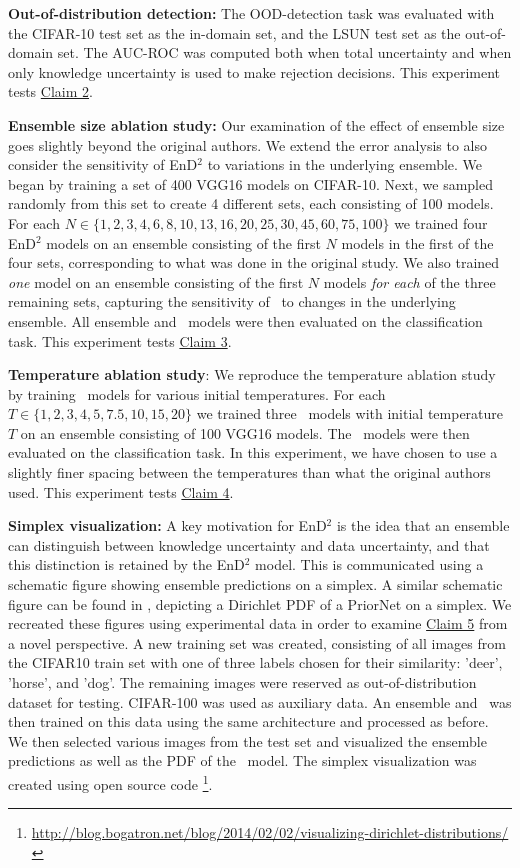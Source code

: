 \textbf{Out-of-distribution detection:} The OOD-detection task was evaluated with the CIFAR-10 test set as the in-domain set, and the LSUN test set as the out-of-domain set. The AUC-ROC was computed both when total uncertainty and when only knowledge uncertainty is used to make rejection decisions. This experiment tests \hyperlink{claim2}{Claim 2}. 

\textbf{Ensemble size ablation study:} Our examination of the effect of ensemble size goes slightly beyond the original authors. We extend the error analysis to also consider the sensitivity of EnD$^2$ to variations in the underlying ensemble. We began by training a set of 400 VGG16 models on CIFAR-10. Next, we sampled randomly from this set to create 4 different sets, each consisting of 100 models. For each $N \in \{1, 2, 3, 4, 6, 8, 10, 13, 16, 20, 25, 30, 45, 60, 75, 100\}$ we trained four EnD$^2$ models on an ensemble consisting of the first $N$ models in the first of the four sets, corresponding to what was done in the original study. We also trained \textit{one} model on an ensemble consisting of the first $N$ models \textit{for each} of the three remaining sets, capturing the sensitivity of \EnDD \ to changes in the underlying ensemble. All ensemble and \EnDD \ models were then evaluated on the classification task. This experiment tests \hyperlink{claim3}{Claim 3}. 

\textbf{Temperature ablation study}: We reproduce the temperature ablation study by training \EnDD \ models for various initial temperatures. For each $T \in \{1, 2, 3, 4, 5, 7.5, 10, 15, 20\}$ we trained three \EnDD \ models with initial temperature $T$ on an ensemble consisting of 100 VGG16 models. The \EnDD \ models were then evaluated on the classification task. In this experiment, we have chosen to use a slightly finer spacing between the temperatures than what the original authors used. This experiment tests \hyperlink{claim4}{Claim 4}.

\textbf{Simplex visualization:} A key motivation for EnD$^2$ is the idea that an ensemble can distinguish between knowledge uncertainty and data uncertainty, and that this distinction is retained by the EnD$^2$ model. This is communicated using a schematic figure showing ensemble predictions on a simplex. A similar schematic figure can be found in \cite{NIPS2018_7936}, depicting a Dirichlet PDF of a PriorNet on a simplex. We recreated these figures using experimental data in order to examine \hyperlink{claim5}{Claim 5} from a novel perspective. A new training set was created, consisting of all images from the CIFAR10 train set with one of three labels chosen for their similarity: 'deer', 'horse', and 'dog'. The remaining images were reserved as out-of-distribution dataset for testing. CIFAR-100 was used as auxiliary data. An ensemble and \EnDD \ was then trained on this data using the same architecture and processed as before. We then selected various images from the test set and visualized the ensemble predictions as well as the PDF of the \EnDD \ model. The simplex visualization was created using open source code \footnote{\url{http://blog.bogatron.net/blog/2014/02/02/visualizing-dirichlet-distributions/}}.

